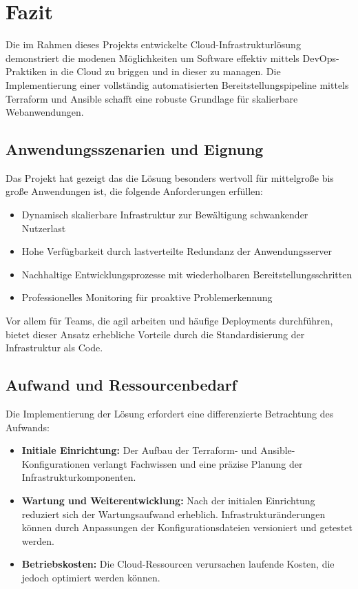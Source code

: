 \chapter{Fazit}

Die im Rahmen dieses Projekts entwickelte Cloud-Infrastrukturlösung demonstriert die modenen Möglichkeiten um Software effektiv mittels DevOps-Praktiken in die Cloud zu briggen und in dieser zu managen. Die Implementierung einer vollständig automatisierten Bereitstellungspipeline mittels Terraform und Ansible schafft eine robuste Grundlage für skalierbare Webanwendungen.

\section{Anwendungsszenarien und Eignung}

Das Projekt hat gezeigt das die Lösung besonders wertvoll für mittelgroße bis große Anwendungen ist, die folgende Anforderungen erfüllen:

\begin{itemize}
    \item Dynamisch skalierbare Infrastruktur zur Bewältigung schwankender Nutzerlast
    \item Hohe Verfügbarkeit durch lastverteilte Redundanz der Anwendungsserver
    \item Nachhaltige Entwicklungsprozesse mit wiederholbaren Bereitstellungsschritten
    \item Professionelles Monitoring für proaktive Problemerkennung
\end{itemize}

Vor allem für Teams, die agil arbeiten und häufige Deployments durchführen, bietet dieser Ansatz erhebliche Vorteile durch die Standardisierung der Infrastruktur als Code.

\section{Aufwand und Ressourcenbedarf}

Die Implementierung der Lösung erfordert eine differenzierte Betrachtung des Aufwands:

\begin{itemize}
    \item \textbf{Initiale Einrichtung:} Der Aufbau der Terraform- und Ansible-Konfigurationen verlangt Fachwissen und eine präzise Planung der Infrastrukturkomponenten.
    \item \textbf{Wartung und Weiterentwicklung:} Nach der initialen Einrichtung reduziert sich der Wartungsaufwand erheblich. Infrastrukturänderungen können durch Anpassungen der Konfigurationsdateien versioniert und getestet werden.
    \item \textbf{Betriebskosten:} Die Cloud-Ressourcen verursachen laufende Kosten, die jedoch optimiert werden können.
\end{itemize}

